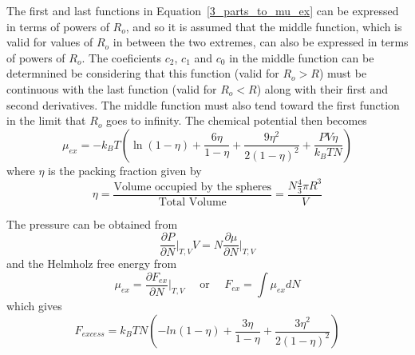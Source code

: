 \documentclass[12pt]{article}
\begin{document}
The first and last functions in Equation~\ref{3_parts_to_mu_ex} can be expressed in terms of powers of $R_o$, and so it is assumed that the middle function, which is valid for values of $R_o$ in between the two extremes, can also be expressed in terms of powers of $R_o$.  The coeficients $c_2$, $c_1$ and $c_0$ in the middle function can be determnined be considering that this function (valid for $R_o > R$) must be continuous with the last function (valid for $R_o < R$) along with their first and second derivatives. The middle function must also tend toward the first function in the limit that $R_o$ goes to infinity. The chemical potential then becomes
\begin{equation}\mu_{ex}=-k_BT\left(\ln(1-\eta) + \frac{6\eta}{1-\eta}+\frac{9\eta^2}{2(1-\eta)^2}+\frac{PV\eta}{k_BTN}\right)\end{equation}
where $\eta$ is the packing fraction given by
\begin{displaymath}\eta = \frac{\mbox{Volume occupied by the spheres}}{\mbox{Total Volume}}=\frac{N\frac{4}{3}\pi{R}^3}{V}\end{displaymath} 


The pressure can be obtained from \color{red}
\begin{equation}{\frac{\partial{P}}{\partial{N}}\bigg|_{T,V}V=N\frac{\partial\mu}{\partial{N}}\bigg|_{T,V}}\end{equation} \color{black}
and the Helmholz free energy from
\begin{displaymath}\mu_{ex}=\frac{\partial{F_{ex}}}{\partial{N}}\bigg|_{T,V}{~~~~~~}\text{or}{~~~~~~}F_{ex}=\int{\mu_{ex}dN}\end{displaymath}
which gives
\begin{equation}F_{excess}=k_BTN\left(-ln(1-\eta)+\frac{3\eta}{1-\eta}+\frac{3{\eta}^2}{2(1-\eta)^2}\right)\end{equation} 
\end{document}

